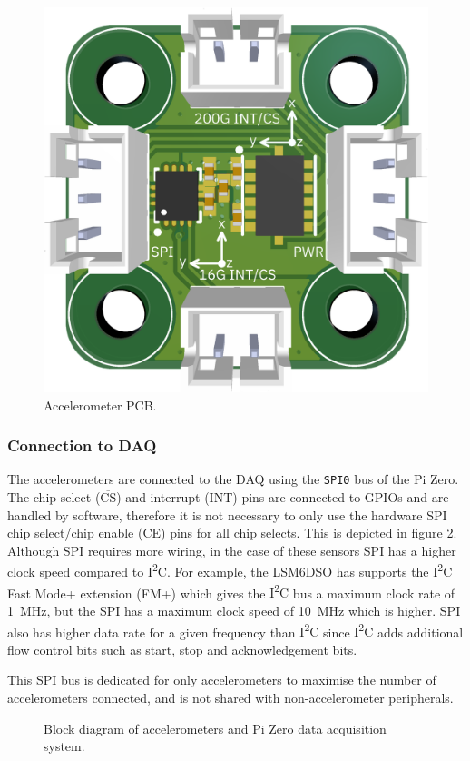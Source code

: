 \documentclass[]{report}
\newcommand{\textoverline}[1]{$\overline{\mbox{#1}}$}
\newcommand{\iic}{{I\textsuperscript{2}C}}
\begin{document}
\begin{figure}[H]
  \centering
  \includegraphics[width=0.5\linewidth]{images/Accelerometers_PCB.png}
  \caption{Accelerometer PCB.}
  \label{fig:accelerometers-pcb}
\end{figure}

\subsubsection{Connection to DAQ}

The accelerometers are connected to the DAQ using the \texttt{SPI0} bus of the Pi Zero. The chip select (\textoverline{CS}) and interrupt (INT) pins are connected to GPIOs and are handled by software, therefore it is not necessary to only use the hardware SPI chip select/chip enable (CE) pins for all chip selects. This is depicted in figure \ref{fig:accelerometers-sch-block}. Although SPI requires more wiring, in the case of these sensors SPI has a higher clock speed compared to {\iic}. For example, the LSM6DSO has supports the {\iic} Fast Mode+ extension (FM+) which gives the {\iic} bus a maximum clock rate of \SI{1}{\mega\hertz}, but the SPI has a maximum clock speed of \SI{10}{\mega\hertz} which is higher. SPI also has higher data rate for a given frequency than {\iic} since {\iic} adds additional flow control bits such as start, stop and acknowledgement bits.

This SPI bus is dedicated for only accelerometers to maximise the number of accelerometers connected, and is not shared with non-accelerometer peripherals.

\begin{figure}[H]
  \centering
  
  \caption{Block diagram of accelerometers and Pi Zero data acquisition system.}
  \label{fig:accelerometers-sch-block}
\end{figure}
\end{document}
